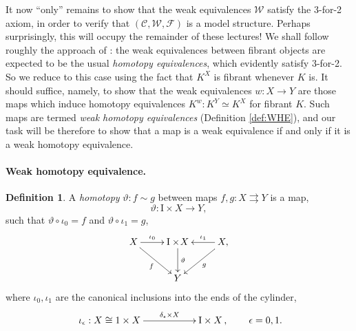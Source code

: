\documentclass[11pt]{amsart}
\newcommand{\WW}{\ensuremath{\mathcal{W}}}
\newcommand{\ra}{\ensuremath{\rightarrow}}
\renewcommand{\to}{\ensuremath{\rightarrow}}
\newcommand{\too}{\ensuremath{\longrightarrow}}
\newcommand{\I}{\ensuremath{\mathrm{I}}}
\newtheorem{corollary}[theorem]{Corollary}
\theoremstyle{remark}
\theoremstyle{definition}
\newtheorem{definition}[theorem]{Definition}
\begin{document}

It now ``only'' remains to show that the weak equivalences $\WW$ satisfy the 3-for-2 axiom, in order to verify that $(\mathcal{C}, \mathcal{W}, \mathcal{F})$ is a model structure.  Perhaps surprisingly, this will occupy the remainder of these lectures!  We shall follow roughly the approach of \cite{Joyal}: the weak equivalences between fibrant objects are expected to be the usual \emph{homotopy equivalences}, which evidently  satisfy 3-for-2.   So we reduce to this case using the fact that $K^X$ is fibrant whenever $K$ is.  It should suffice, namely, to show that the weak equivalences $w : X\to Y$ are those maps which induce homotopy equivalences $K^w : K^Y \simeq K^X$ for fibrant $K$.   Such maps are termed \emph{weak homotopy equivalences}  (Definition \ref{def:WHE}), and our task will be therefore to show that a map is a weak equivalence if and only if it is a weak homotopy equivalence.

\paragraph{Weak homotopy equivalence.}


\begin{definition}\label{homotopy}
A \emph{homotopy} $\vartheta : f \sim g$ between maps $f, g: X\rightrightarrows Y$  is a map,
\[
\vartheta : \I\times{X} \too Y,
\]
such that $\vartheta \circ \iota_0 = f$ and $\vartheta \circ \iota_1 = g$, 
\begin{equation}\label{diagram:defhomotopy}
\xymatrix{
X \ar[r]^-{\iota_0} \ar[rd]_f & \I\times\!{X} \ar[d]^-{\vartheta} & X, \ar[l]_-{\iota_1} \ar[ld]^g \\
& Y &
}
\end{equation}
where $\iota_0, \iota_1$  are the canonical inclusions into the ends of the cylinder,
\[
\xymatrix{
\iota_\epsilon : X \cong 1\times X \ar[rr]^-{\delta_\epsilon\times X} && \I\times X\,,} \qquad \epsilon = 0,1 .
\]
\end{definition}
\end{document}
